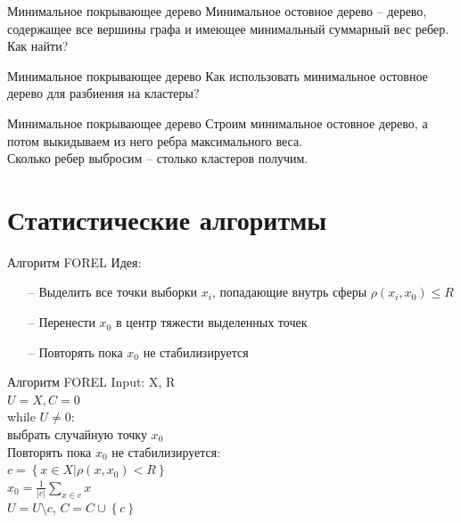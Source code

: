 \documentclass[10pt]{beamer}
\begin{document}
\begin{frame}{Минимальное покрывающее дерево}
	Минимальное остовное дерево -- дерево, содержащее все вершины графа и имеющее минимальный суммарный вес ребер.\\
	\bigbreak
	Как найти?
\end{frame}

\begin{frame}{Минимальное покрывающее дерево}
  Как использовать минимальное остовное дерево для разбиения на кластеры?
\end{frame}

\begin{frame}{Минимальное покрывающее дерево}
	Строим минимальное остовное дерево, а потом выкидываем из него ребра максимального веса.\\
	\bigbreak
	Сколько ребер выбросим -- столько кластеров получим.
\end{frame}

\section{Статистические алгоритмы}

\begin{frame}{Алгоритм FOREL}
  \alert{Идея}:\\
	\begin{itemize}
		\item[--] Выделить все точки выборки $x_i$, попадающие внутрь сферы $\rho(x_i, x_0) \leq R$
		\item[--] Перенести $x_0$ в центр тяжести выделенных точек
		\item[--] Повторять пока $x_0$ не стабилизируется
	\end{itemize}
\end{frame}

\begin{frame}{Алгоритм FOREL}
	Input: X, R\\
	${U = X, C = 0}$\\\vspace{2mm}
	while ${U \neq 0}$:\\
	\hspace{5mm} выбрать случайную точку $x_0$\\
	\vspace{2mm}
	\hspace{5mm} Повторять пока $x_0$ не стабилизируется:\\
	\vspace{2mm}
	\hspace{10mm} ${c = \left\{ x \in X \vert \rho(x, x_0) < R \right\}}$ \\
	\vspace{2mm}
	\hspace{10mm} $x_0 = \frac{1}{\vert c \vert} \sum\limits_{x \in c} x$\\
	\vspace{2mm}
	\hspace{5mm} ${U = U \setminus c}$, ${C = C \cup \left\{ c \right\}}$
\end{frame}
\end{document}
